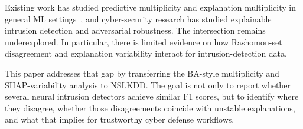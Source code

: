 Existing work has studied predictive multiplicity and explanation multiplicity in general \gls{ML} settings~\cite{black2022model,marx2020predictive,brunet2022implications,laberge2023partial}, and cyber-security research has studied explainable intrusion detection and adversarial robustness. The intersection remains underexplored. In particular, there is limited evidence on how Rashomon-set disagreement and explanation variability interact for intrusion-detection data.

This paper addresses that gap by transferring the BA-style multiplicity and \gls{SHAP}-variability analysis to \gls{NSLKDD}. The goal is not only to report whether several neural intrusion detectors achieve similar \gls{F1} scores, but to identify where they disagree, whether those disagreements coincide with unstable explanations, and what that implies for trustworthy cyber defense workflows.
